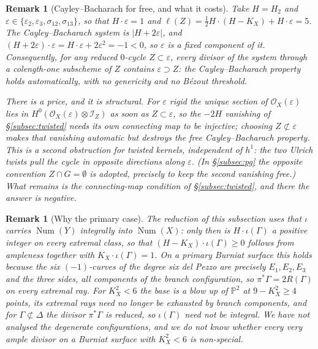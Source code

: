 \documentclass[10pt,a4paper]{amsart}
\newtheorem{remark}[theorem]{Remark}
\newcommand{\OO}{\mathcal{O}}
\newcommand{\II}{\mathcal{I}}
\newcommand{\PP}{\mathbb{P}}
\newcommand{\Num}{\operatorname{Num}}
\newcommand{\len}{\ell}
\begin{document}
\begin{remark}[Cayley--Bacharach for free, and what it costs]\label{rem:CBfree}
Take $H=H_2$ and $\varepsilon\in\{\varepsilon_2,\varepsilon_3,\sigma_{12},\sigma_{13}\}$, so that $H\cdot\varepsilon=1$ and $\len(Z)=\tfrac12H\cdot(H-K_X)+H\cdot\varepsilon=5$. The Cayley--Bacharach system is $|H+2\varepsilon|$, and $(H+2\varepsilon)\cdot\varepsilon=H\cdot\varepsilon+2\varepsilon^2=-1<0$, so $\varepsilon$ is a \emph{fixed component} of it. Consequently, for any reduced $0$-cycle $Z\subset\varepsilon$, every divisor of the system through a colength-one subscheme of $Z$ contains $\varepsilon\supset Z$: the Cayley--Bacharach property holds automatically, with no genericity and no B\'ezout threshold.

There is a price, and it is structural. For $\varepsilon$ rigid the unique section of $\OO_X(\varepsilon)$ lies in $H^0(\OO_X(\varepsilon)\otimes\II_Z)$ as soon as $Z\subset\varepsilon$, so the $-2H$ vanishing of \S\ref{subsec:twisted} needs its own connecting map to be injective; choosing $Z\not\subset\varepsilon$ makes that vanishing automatic but destroys the free Cayley--Bacharach property. This is a second obstruction for twisted kernels, independent of $h^1$: \emph{the two Ulrich twists pull the cycle in opposite directions along $\varepsilon$}. (In \S\ref{subsec:pg} the opposite convention $Z\cap G=\emptyset$ is adopted, precisely to keep the second vanishing free.) What remains is the connecting-map condition of \S\ref{subsec:twisted}, and there the answer is negative.
\end{remark}

\begin{remark}[Why the primary case]\label{rem:integrality}
The reduction of this subsection uses that $\iota$ carries $\Num(Y)$ integrally into $\Num(X)$: only then is $H\cdot\iota(\Gamma)$ a positive integer on every extremal class, so that $(H-K_X)\cdot\iota(\Gamma)\ge0$ follows from ampleness together with $K_X\cdot\iota(\Gamma)=1$. On a primary Burniat surface this holds because the six $(-1)$-curves of the degree six del Pezzo are precisely $E_1,E_2,E_3$ and the three sides, all components of the branch configuration, so $\pi^*\Gamma=2R(\Gamma)$ on every extremal ray. For $K_X^2<6$ the base is a blow up of $\PP^2$ at $9-K_X^2\ge4$ points, its extremal rays need no longer be exhausted by branch components, and for $\Gamma\not\subset\Delta$ the divisor $\pi^*\Gamma$ is reduced, so $\iota(\Gamma)$ need not be integral. We have not analysed the degenerate configurations, and we do not know whether every very ample divisor on a Burniat surface with $K_X^2<6$ is non-special.
\end{remark}
\end{document}
